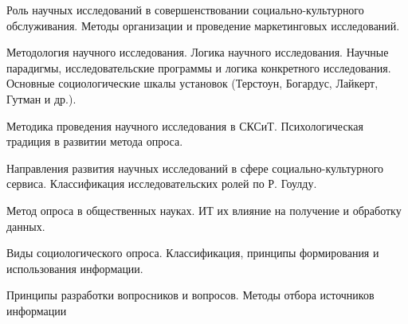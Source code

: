\documentclass[
	14pt,
	a4paper,
	]
	{scrartcl}
\begin{document}
\shapk
{}
\setcounter{zad}{0}

\vfill
\z Роль научных исследований в совершенствовании социально-культурного обслуживания.
 \vfill
\z Методы организации и проведение маркетинговых исследований. \vfill

\vfill

\newpage


\shapk
{}
\setcounter{zad}{0}

\vfill
\z Методология научного исследования. Логика научного исследования. Научные парадигмы, исследовательские программы и логика конкретного исследования.
 \vfill
\z Основные социологические шкалы установок (Терстоун, Богардус, Лайкерт, Гутман и др.).
 \vfill

\vfill

\newpage


\shapk
{}
\setcounter{zad}{0}

\vfill
\z Методика проведения научного исследования в СКСиТ.
 \vfill
\z Психологическая традиция в развитии метода опроса.
 \vfill

\vfill

\newpage


\shapk
{}
\setcounter{zad}{0}

\vfill
\z Направления развития научных исследований в сфере социально-культурного сервиса.
 \vfill
\z Классификация исследовательских ролей по Р. Гоулду.
 \vfill

\vfill

\newpage


\shapk
{}
\setcounter{zad}{0}

\vfill
\z Метод опроса в общественных науках.
 \vfill
\z ИТ их влияние на получение и обработку данных.
 \vfill

\vfill

\newpage


\shapk
{}
\setcounter{zad}{0}

\vfill
\z Виды социологического опроса.
 \vfill
\z Классификация, принципы формирования и использования информации.
 \vfill

\vfill

\newpage


\shapk
{}
\setcounter{zad}{0}

\vfill
\z Принципы разработки вопросников и вопросов.
 \vfill
\z  Методы отбора источников информации
 \vfill
\end{document}

